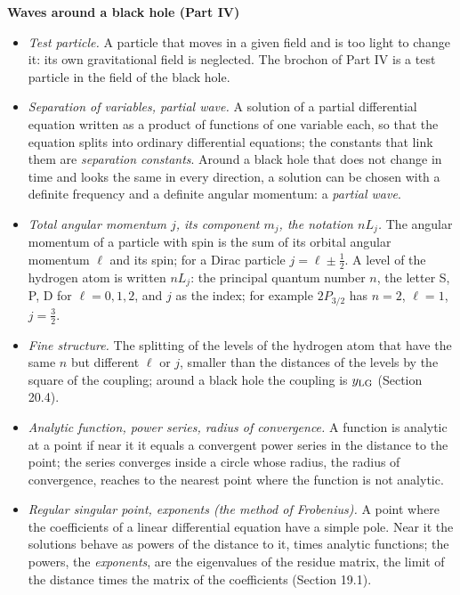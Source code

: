 \documentclass[
  10pt,
]{article}
\providecommand{\tightlist}{%
  \setlength{\itemsep}{0pt}\setlength{\parskip}{0pt}}
\begin{document}
\textbf{Waves around a black hole (Part IV)}

\begin{itemize}
\tightlist
\item
  \emph{Test particle.} A particle that moves in a given field and is
  too light to change it: its own gravitational field is neglected. The
  brochon of Part IV is a test particle in the field of the black hole.
\item
  \emph{Separation of variables, partial wave.} A solution of a partial
  differential equation written as a product of functions of one
  variable each, so that the equation splits into ordinary differential
  equations; the constants that link them are \emph{separation
  constants}. Around a black hole that does not change in time and looks
  the same in every direction, a solution can be chosen with a definite
  frequency and a definite angular momentum: a \emph{partial wave}.
\item
  \emph{Total angular momentum \(j\), its component \(m_j\), the
  notation \(nL_j\).} The angular momentum of a particle with spin is
  the sum of its orbital angular momentum \(\ell\) and its spin; for a
  Dirac particle \(j=\ell\pm\tfrac12\). A level of the hydrogen atom is
  written \(nL_j\): the principal quantum number \(n\), the letter S, P,
  D for \(\ell=0,1,2\), and \(j\) as the index; for example \(2P_{3/2}\)
  has \(n=2\), \(\ell=1\), \(j=\tfrac32\).
\item
  \emph{Fine structure.} The splitting of the levels of the hydrogen
  atom that have the same \(n\) but different \(\ell\) or \(j\), smaller
  than the distances of the levels by the square of the coupling; around
  a black hole the coupling is \(y_{\rm LG}\) (Section 20.4).
\item
  \emph{Analytic function, power series, radius of convergence.} A
  function is analytic at a point if near it it equals a convergent
  power series in the distance to the point; the series converges inside
  a circle whose radius, the radius of convergence, reaches to the
  nearest point where the function is not analytic.
\item
  \emph{Regular singular point, exponents (the method of Frobenius).} A
  point where the coefficients of a linear differential equation have a
  simple pole. Near it the solutions behave as powers of the distance to
  it, times analytic functions; the powers, the \emph{exponents}, are
  the eigenvalues of the residue matrix, the limit of the distance times
  the matrix of the coefficients (Section 19.1).

\end{itemize}
\end{document}
